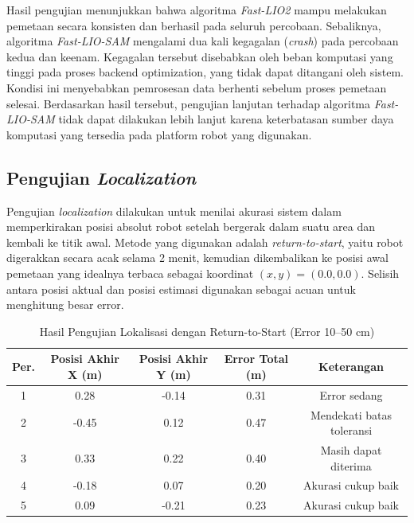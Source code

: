Hasil pengujian menunjukkan bahwa algoritma \emph{Fast-LIO2} mampu melakukan pemetaan secara konsisten dan berhasil pada seluruh percobaan. Sebaliknya, algoritma \emph{Fast-LIO-SAM} mengalami dua kali kegagalan (\emph{crash}) pada percobaan kedua dan keenam. Kegagalan tersebut disebabkan oleh beban komputasi yang tinggi pada proses backend optimization, yang tidak dapat ditangani oleh sistem. Kondisi ini menyebabkan pemrosesan data berhenti sebelum proses pemetaan selesai. Berdasarkan hasil tersebut, pengujian lanjutan terhadap algoritma \emph{Fast-LIO-SAM} tidak dapat dilakukan lebih lanjut karena keterbatasan sumber daya komputasi yang tersedia pada platform robot yang digunakan.




\subsection{Pengujian \emph{Localization}}
Pengujian \emph{localization} dilakukan untuk menilai akurasi sistem dalam memperkirakan posisi absolut robot setelah bergerak dalam suatu area dan kembali ke titik awal. Metode yang digunakan adalah \emph{return-to-start}, yaitu robot digerakkan secara acak selama 2 menit, kemudian dikembalikan ke posisi awal pemetaan yang idealnya terbaca sebagai koordinat $(x, y) = (0.0, 0.0)$. Selisih antara posisi aktual dan posisi estimasi digunakan sebagai acuan untuk menghitung besar error.

\begin{table}[H]
	\centering
	\caption{Hasil Pengujian Lokalisasi dengan Return-to-Start (Error 10--50 cm)}
	\label{tab:hasil_localization}
	\begin{tabular}{|c|c|c|c|c|}
		\hline
		\textbf{Per.} & \textbf{Posisi Akhir X (m)} & \textbf{Posisi Akhir Y (m)} & \textbf{Error Total (m)} & \textbf{Keterangan}       \\
		\hline
		1             & 0.28                        & -0.14                       & 0.31                     & Error sedang              \\
		2             & -0.45                       & 0.12                        & 0.47                     & Mendekati batas toleransi \\
		3             & 0.33                        & 0.22                        & 0.40                     & Masih dapat diterima      \\
		4             & -0.18                       & 0.07                        & 0.20                     & Akurasi cukup baik        \\
		5             & 0.09                        & -0.21                       & 0.23                     & Akurasi cukup baik        \\
		\hline
	\end{tabular}
\end{table}

